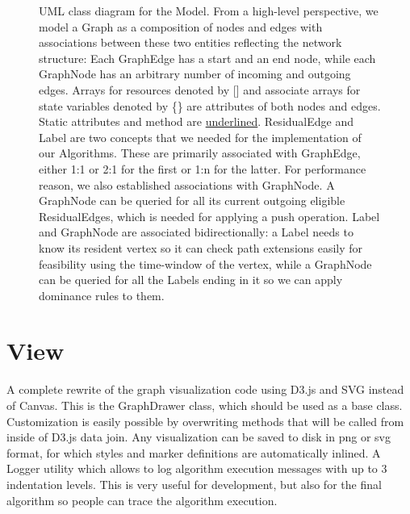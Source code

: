 \begin{figure}
\begin{tikzpicture}
\end{tikzpicture}
\caption{UML class diagram for the Model. From a high-level perspective, we model a Graph as a composition of nodes and edges with associations between these two entities reflecting the network structure: Each GraphEdge has a start and an end node, while each GraphNode has an arbitrary number of incoming and outgoing edges. Arrays for resources denoted by [] and associate arrays for state variables denoted by \{\} are attributes of both nodes and edges. Static attributes and method are \underline{underlined}. ResidualEdge and Label are two concepts that we needed for the implementation of our Algorithms. These are primarily associated with GraphEdge, either 1:1 or 2:1 for the first or 1:n for the latter. For performance reason, we also established associations with GraphNode. A GraphNode can be queried for all its current outgoing eligible ResidualEdges, which is needed for applying a push operation. Label and GraphNode are associated bidirectionally: a Label needs to know its resident vertex so it can check path extensions easily for feasibility using the time-window of the vertex, while a GraphNode can be queried for all the Labels ending in it so we can apply dominance rules to them.}
\label{fig:model}
\end{figure}



\section{View}
 A complete rewrite of the graph visualization code using D3.js and SVG instead of Canvas. This is the GraphDrawer class, which should be used as a base class. Customization is easily possible by overwriting methods that will be called from inside of D3.js data join. Any visualization can be saved to disk in png or svg format, for which styles and marker definitions are automatically inlined. A Logger utility which allows to log algorithm execution messages with up to 3 indentation levels. This is very useful for development, but also for the final algorithm so people can trace the algorithm execution.



